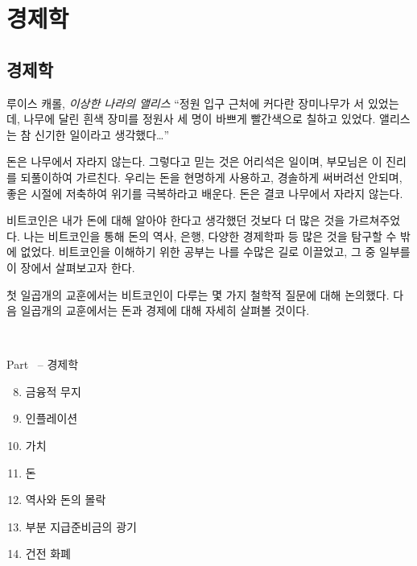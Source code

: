 \part{경제학}
\label{ch:economics}
\chapter*{경제학}

\begin{chapquote}{루이스 캐롤, \textit{이상한 나라의 앨리스}}
	\enquote{정원 입구 근처에 커다란 장미나무가 서 있었는데, 나무에 달린 흰색 장미를 정원사 세 명이 바쁘게 빨간색으로 칠하고 있었다.
		앨리스는 참 신기한 일이라고 생각했다\ldots}
\end{chapquote}

돈은 나무에서 자라지 않는다. 그렇다고 믿는 것은 어리석은 일이며, 부모님은 이 진리를 되풀이하여 가르친다.
우리는 돈을 현명하게 사용하고, 경솔하게 써버려선 안되며, 좋은 시절에 저축하여 위기를 극복하라고 배운다. 
돈은 결코 나무에서 자라지 않는다.

비트코인은 내가 돈에 대해 알아야 한다고 생각했던 것보다 더 많은 것을 가르쳐주었다. 
나는 비트코인을 통해 돈의 역사, 은행, 다양한 경제학파 등 많은 것을 탐구할 수 밖에 없었다.
비트코인을 이해하기 위한 공부는 나를 수많은 길로 이끌었고, 그 중 일부를 이 장에서 살펴보고자 한다. 

첫 일곱개의 교훈에서는 비트코인이 다루는 몇 가지 철학적 질문에 대해 논의했다.
다음 일곱개의 교훈에서는 돈과 경제에 대해 자세히 살펴볼 것이다. 

~

\begin{samepage}
	Part~\ref{ch:economics} -- 경제학
	
	\begin{enumerate}
		\setcounter{enumi}{7}
		\item 금융적 무지
		\item 인플레이션
		\item 가치
		\item 돈
		\item 역사와 돈의 몰락
		\item 부분 지급준비금의 광기
		\item 건전 화폐
\end{enumerate}
\end{samepage}

